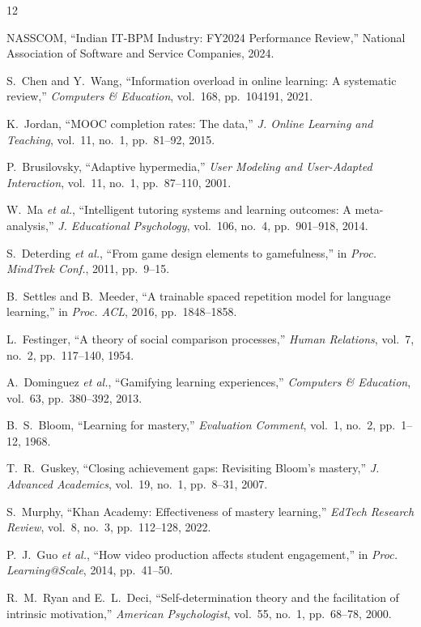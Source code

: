 \documentclass[journal]{IEEEtran}
\begin{document}

\begin{thebibliography}{12}

NASSCOM, ``Indian IT-BPM Industry: FY2024 Performance Review,'' National Association of Software and Service Companies, 2024.

S.~Chen and Y.~Wang, ``Information overload in online learning: A systematic review,'' \emph{Computers \& Education}, vol.~168, pp.~104191, 2021.

K.~Jordan, ``MOOC completion rates: The data,'' \emph{J. Online Learning and Teaching}, vol.~11, no.~1, pp.~81--92, 2015.

P.~Brusilovsky, ``Adaptive hypermedia,'' \emph{User Modeling and User-Adapted Interaction}, vol.~11, no.~1, pp.~87--110, 2001.

W.~Ma \emph{et al.}, ``Intelligent tutoring systems and learning outcomes: A meta-analysis,'' \emph{J. Educational Psychology}, vol.~106, no.~4, pp.~901--918, 2014.

S.~Deterding \emph{et al.}, ``From game design elements to gamefulness,'' in \emph{Proc. MindTrek Conf.}, 2011, pp.~9--15.

B.~Settles and B.~Meeder, ``A trainable spaced repetition model for language learning,'' in \emph{Proc. ACL}, 2016, pp.~1848--1858.

L.~Festinger, ``A theory of social comparison processes,'' \emph{Human Relations}, vol.~7, no.~2, pp.~117--140, 1954.

A.~Dominguez \emph{et al.}, ``Gamifying learning experiences,'' \emph{Computers \& Education}, vol.~63, pp.~380--392, 2013.

B.~S.~Bloom, ``Learning for mastery,'' \emph{Evaluation Comment}, vol.~1, no.~2, pp.~1--12, 1968.

T.~R.~Guskey, ``Closing achievement gaps: Revisiting Bloom's mastery,'' \emph{J. Advanced Academics}, vol.~19, no.~1, pp.~8--31, 2007.

S.~Murphy, ``Khan Academy: Effectiveness of mastery learning,'' \emph{EdTech Research Review}, vol.~8, no.~3, pp.~112--128, 2022.

P.~J.~Guo \emph{et al.}, ``How video production affects student engagement,'' in \emph{Proc. Learning@Scale}, 2014, pp.~41--50.

R.~M.~Ryan and E.~L.~Deci, ``Self-determination theory and the facilitation of intrinsic motivation,'' \emph{American Psychologist}, vol.~55, no.~1, pp.~68--78, 2000.

\end{thebibliography}
\end{document}
